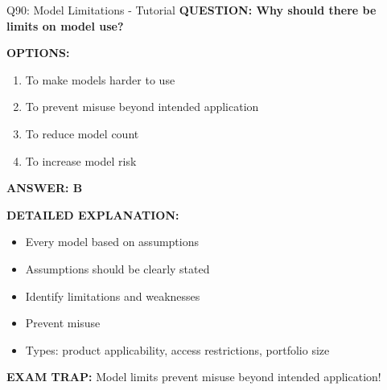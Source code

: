 \documentclass[8pt]{beamer}
\begin{document}
	\begin{frame}{Q90: Model Limitations - Tutorial}
		\fontsize{6.5}{7.5}\selectfont
		\textbf{QUESTION: Why should there be limits on model use?}
		
		\vspace{0.1cm}
		\textbf{OPTIONS:}
		\begin{enumerate}
			\item To make models harder to use
			\item To prevent misuse beyond intended application
			\item To reduce model count
			\item To increase model risk
		\end{enumerate}
		
		\vspace{0.1cm}
		\textcolor{myblue}{\textbf{ANSWER: B}}
		
		\vspace{0.1cm}
		\textbf{DETAILED EXPLANATION:}
		\begin{itemize}
			\item Every model based on assumptions
			\item Assumptions should be clearly stated
			\item Identify limitations and weaknesses
			\item Prevent misuse
			\item Types: product applicability, access restrictions, portfolio size
		\end{itemize}
		
		\vspace{0.1cm}
		\textcolor{myred}{\textbf{EXAM TRAP:}} Model limits prevent \textcolor{myblue}{misuse beyond intended application}!
	\end{frame}
	
\end{document}
